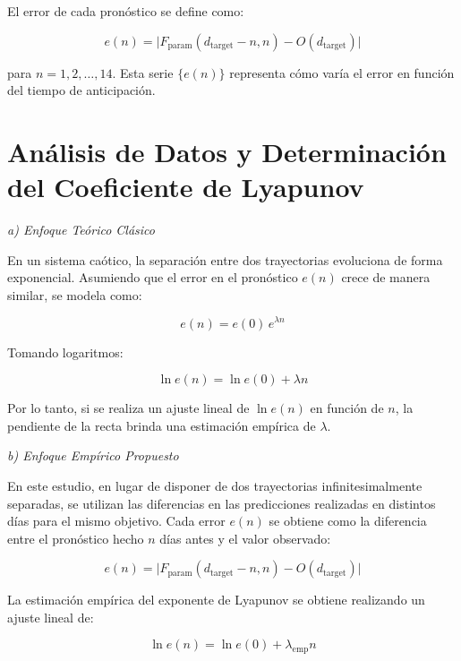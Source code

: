 \documentclass[
  10pt,
  a4paper,
  DIV=11,
  numbers=noendperiod,
  open=any]{scrreprt}
\numberwithin{equation}{chapter}
\numberwithin{equation}{section}
\renewcommand{\[}{\begin{equation}}
\renewcommand{\]}{\end{equation}}
\begin{document}
El error de cada pronóstico se define como:

\begin{equation}
e(n) = \bigl| F_{\text{param}}(d_{\text{target}}-n, n) - O(d_{\text{target}}) \bigr|
\end{equation}

para \(n = 1,2,\dots,14\). Esta serie \(\{e(n)\}\) representa cómo varía
el error en función del tiempo de anticipación.

\section{Análisis de Datos y Determinación del Coeficiente de
Lyapunov}\label{anuxe1lisis-de-datos-y-determinaciuxf3n-del-coeficiente-de-lyapunov}

\emph{a) Enfoque Teórico Clásico}

En un sistema caótico, la separación entre dos trayectorias evoluciona
de forma exponencial. Asumiendo que el error en el pronóstico \(e(n)\)
crece de manera similar, se modela como:

\begin{equation}
e(n) = e(0)\, e^{\lambda n}
\end{equation}

Tomando logaritmos:

\begin{equation}
\ln e(n) = \ln e(0) + \lambda n
\end{equation}

Por lo tanto, si se realiza un ajuste lineal de \(\ln e(n)\) en función
de \(n\), la pendiente de la recta brinda una estimación empírica de
\(\lambda\).

\emph{b) Enfoque Empírico Propuesto}

En este estudio, en lugar de disponer de dos trayectorias
infinitesimalmente separadas, se utilizan las diferencias en las
predicciones realizadas en distintos días para el mismo objetivo. Cada
error \(e(n)\) se obtiene como la diferencia entre el pronóstico hecho
\(n\) días antes y el valor observado:

\begin{equation}
e(n) = \bigl| F_{\text{param}}(d_{\text{target}}-n, n) - O(d_{\text{target}}) \bigr|
\end{equation}

La estimación empírica del exponente de Lyapunov se obtiene realizando
un ajuste lineal de:

\begin{equation}
\ln e(n) = \ln e(0) + \lambda_{\text{emp}} n
\end{equation}
\end{document}
